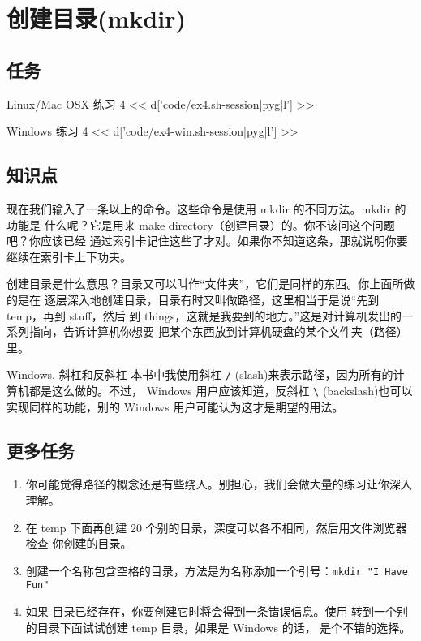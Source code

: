 \chapter{创建目录(mkdir)}

\section{任务}

\begin{code}{Linux/Mac OSX 练习 4}
<< d['code/ex4.sh-session|pyg|l'] >>
\end{code}

\begin{code}{Windows 练习 4}
<< d['code/ex4-win.sh-session|pyg|l'] >>
\end{code}

\section{知识点}

现在我们输入了一条以上的命令。这些命令是使用 mkdir 的不同方法。mkdir 的功能是
什么呢？它是用来 make directory（创建目录）的。你不该问这个问题吧？你应该已经
通过索引卡记住这些了才对。如果你不知道这条，那就说明你要继续在索引卡上下功夫。

创建目录是什么意思？目录又可以叫作“文件夹”，它们是同样的东西。你上面所做的是在
逐层深入地创建目录，目录有时又叫做路径，这里相当于是说“先到 temp，再到 stuff，然后
到 things，这就是我要到的地方。”这是对计算机发出的一系列指向，告诉计算机你想要
把某个东西放到计算机硬盘的某个文件夹（路径）里。


\begin{aside}{Windows, 斜杠和反斜杠}
本书中我使用斜杠 \verb|/| (slash)来表示路径，因为所有的计算机都是这么做的。不过，
Windows 用户应该知道，反斜杠 \verb|\| (backslash)也可以实现同样的功能，别的
Windows 用户可能认为这才是期望的用法。
\end{aside}

\section{更多任务}

\begin{enumerate}
\item 你可能觉得路径的概念还是有些绕人。别担心，我们会做大量的练习让你深入理解。
\item 在 temp 下面再创建 20 个别的目录，深度可以各不相同，然后用文件浏览器检查
你创建的目录。
\item 创建一个名称包含空格的目录，方法是为名称添加一个引号：\verb|mkdir "I Have Fun"|
\item 如果  目录已经存在，你要创建它时将会得到一条错误信息。使用 
 转到一个别的目录下面试试创建 temp 目录，如果是 Windows 的话，
是个不错的选择。
\end{enumerate}

